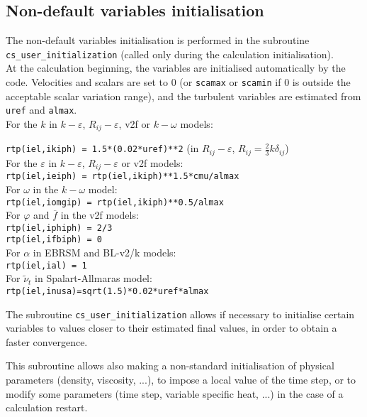 {{%
\subsection{Non-default variables initialisation} \label{sec:cs_user_initialization}

The non-default variables initialisation is performed in the subroutine \texttt{cs\_user\_initialization} (called only during the calculation initialisation).\\ At the calculation beginning, the variables are initialised
automatically by the code. Velocities and scalars are set to 0 (or \texttt{scamax} or \texttt{scamin} if 0 is outside the acceptable
scalar variation range), and the turbulent variables are estimated from
\texttt{uref} and \texttt{almax}. \\
For the $k$ in $k-\varepsilon$, $R_{ij}-\varepsilon$, v2f or $k-\omega$
models:\\
{\texttt{rtp(iel,ikiph) = 1.5*(0.02*uref)**2}
(in $R_{ij}-\varepsilon$,  $R_{ij}=\frac{2}{3}k\delta_{ij}$)\\
For the $\varepsilon$ in $k-\varepsilon$, $R_{ij}-\varepsilon$ or v2f models:\\
\texttt{rtp(iel,ieiph) = rtp(iel,ikiph)**1.5*cmu/almax}\\
For $\omega$ in the $k-\omega$ model:\\
\texttt{rtp(iel,iomgip) = rtp(iel,ikiph)**0.5/almax}\\
For $\varphi$ and $\overline{f}$ in the v2f models:\\
\texttt{rtp(iel,iphiph) = 2/3}\\
\texttt{rtp(iel,ifbiph) = 0}\\
For $\alpha$ in EBRSM and BL-v2/k models:\\
\texttt{rtp(iel,ial) = 1}\\
For $\tilde{\nu}_t$ in Spalart-Allmaras model:\\
\texttt{rtp(iel,inusa)=sqrt(1.5)*0.02*uref*almax}

The subroutine \texttt{cs\_user\_initialization} allows if necessary to initialise certain
variables to values closer to their estimated final values, in order to
obtain a faster convergence.

This subroutine allows also making a non-standard initialisation of
physical parameters (density, viscosity, ...), to impose a local
value of the time step, or to modify some parameters (time step,
variable specific heat, ...) in the case of a calculation restart.

}}}
